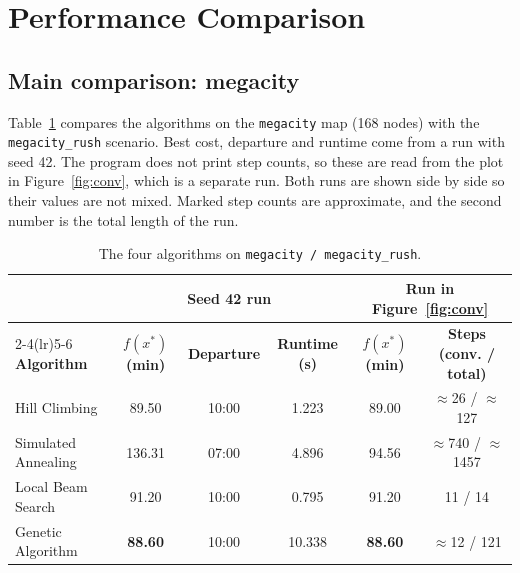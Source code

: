 \documentclass[11pt,a4paper]{article}
\newcommand{\col}[1]{\texttt{#1}}
\begin{document}
\section{Performance Comparison}

\subsection{Main comparison: megacity}

Table~\ref{tab:main} compares the algorithms on the \col{megacity} map (168 nodes) with the
\col{megacity\_rush} scenario. Best cost, departure and runtime come from a run with seed 42. The
program does not print step counts, so these are read from the plot in Figure~\ref{fig:conv}, which
is a separate run. Both runs are shown side by side so their values are not mixed. Marked step counts
are approximate, and the second number is the total length of the run.

\begin{table}[H]
\centering
\caption{The four algorithms on \col{megacity / megacity\_rush}.}
\label{tab:main}
\small
\setlength{\tabcolsep}{5pt}
\begin{tabular}{lccccc}
\toprule
 & \multicolumn{3}{c}{\textbf{Seed 42 run}} & \multicolumn{2}{c}{\textbf{Run in Figure~\ref{fig:conv}}} \\
\cmidrule(lr){2-4}\cmidrule(lr){5-6}
\textbf{Algorithm} & \textbf{$f(x^*)$ (min)} & \textbf{Departure} & \textbf{Runtime (s)} & \textbf{$f(x^*)$ (min)} & \textbf{Steps (conv. / total)} \\
\midrule
Hill Climbing       & 89.50 & 10:00 & 1.223 & 89.00 & $\approx$26 / $\approx$127 \\
Simulated Annealing & 136.31 & 07:00 & 4.896 & 94.56 & $\approx$740 / $\approx$1457 \\
Local Beam Search   & 91.20 & 10:00 & 0.795 & 91.20 & 11 / 14 \\
Genetic Algorithm   & \textbf{88.60} & 10:00 & 10.338 & \textbf{88.60} & $\approx$12 / 121 \\
\bottomrule
\end{tabular}
\end{table}
\end{document}
